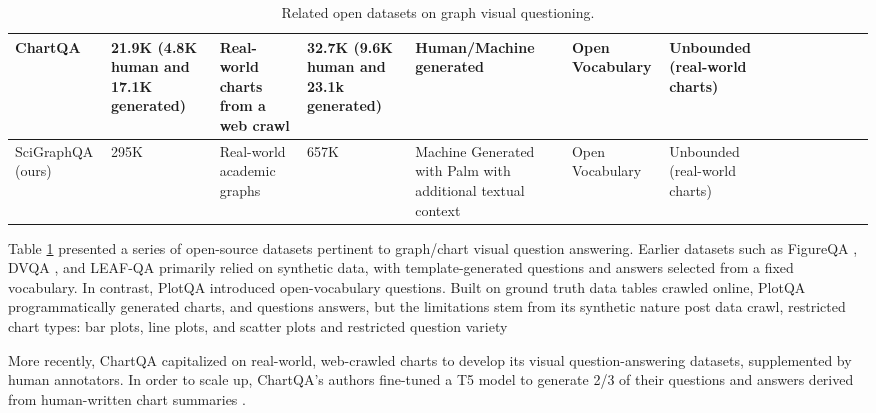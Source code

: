 \documentclass{article}
\begin{document}
\begin{table}[!htbp]
\begin{adjustbox}{max width=\textwidth}
\begin{tabular}{p{2.33cm}p{2.33cm}p{2.33cm}p{2.33cm}p{2.33cm}p{2.33cm}p{2.99cm}p{2.33cm}p{2.33cm}p{2.33cm}p{2.33cm}p{2.33cm}p{2.33cm}p{2.99cm}}
\hline
\multicolumn{1}{|p{2.33cm}}{ChartQA \cite{masry2022chartqa}} & 
\multicolumn{1}{|p{2.33cm}}{21.9K (4.8K human and 17.1K generated) } & 
\multicolumn{1}{|p{2.33cm}}{Real-world charts from a web crawl} & 
\multicolumn{1}{|p{2.33cm}}{32.7K (9.6K human and 23.1k generated)} & 
\multicolumn{1}{|p{2.33cm}}{Human/Machine generated} & 
\multicolumn{1}{|p{2.33cm}}{Open Vocabulary} & 
\multicolumn{1}{|p{2.99cm}|}{Unbounded (real-world charts)} \\ 
\hline
\multicolumn{1}{|p{2.33cm}}{SciGraphQA (ours)} & 
\multicolumn{1}{|p{2.33cm}}{295K} & 
\multicolumn{1}{|p{2.33cm}}{Real-world academic graphs } & 
\multicolumn{1}{|p{2.33cm}}{657K} & 
\multicolumn{1}{|p{2.33cm}}{Machine Generated with Palm with additional textual context} & 
\multicolumn{1}{|p{2.33cm}}{Open Vocabulary} & 
\multicolumn{1}{|p{2.99cm}|}{Unbounded (real-world charts)} \\ 
\hline
\end{tabular}
\end{adjustbox}
\caption{Related open datasets on graph visual questioning.}
\label{tab:related_open_datasets_graph_visual}\end{table}
Table \ref{tab:related_open_datasets_graph_visual} presented a series of open-source datasets pertinent to graph/chart visual question answering. Earlier datasets such as FigureQA \cite{kahou2017figureqa}, DVQA \cite{kafle2018}, and LEAF-QA \cite{chaudhry2019} primarily relied on synthetic data, with template-generated questions and answers selected from a fixed vocabulary. In contrast, PlotQA \cite{methani2020plotqa} introduced open-vocabulary questions. Built on ground truth data tables crawled online, PlotQA programmatically generated charts, and questions answers, but the limitations stem from its synthetic nature post data crawl,  restricted chart types: bar plots, line plots, and scatter plots and restricted question variety \cite{methani2020plotqa}

More recently, ChartQA capitalized on real-world, web-crawled charts to develop its visual question-answering datasets, supplemented by human annotators. In order to scale up, ChartQA's authors fine-tuned a T5 model to generate 2/3 of their questions and answers derived from human-written chart summaries \cite{masry2022chartqa}. 
\end{document}
